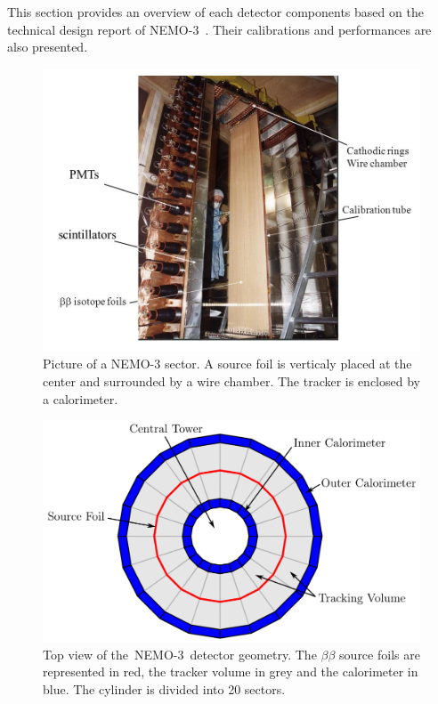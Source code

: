 \documentclass[main.tex]{subfiles}
\begin{document}
\NI This section provides an overview of each detector components based on the technical design report of NEMO-3~\cite{NEMO-3-detector}. Their calibrations and performances are also presented.  




\begin{figure}[h!]
\begin{center}
\includegraphics[scale=0.55]{pictures/Chap2/sector.jpg}
\caption{Picture of a NEMO-3 sector. A source foil is verticaly placed at the center and surrounded by a wire chamber. The tracker is enclosed by a calorimeter.}
\label{NEMO3SectorPictures}
\end{center}
\end{figure}


\begin{figure}[h!]
\begin{center}
\includegraphics[scale=0.25]{pictures/Chap2/TopViewNEMO3.png}
\caption{Top view of the~NEMO-3~detector geometry. The $\beta\beta$ source foils are represented in red, the tracker volume in grey and the calorimeter in blue. The cylinder is divided into 20 sectors.}
\label{TopViewNEMO3}
\end{center}
\end{figure}
\end{document}
